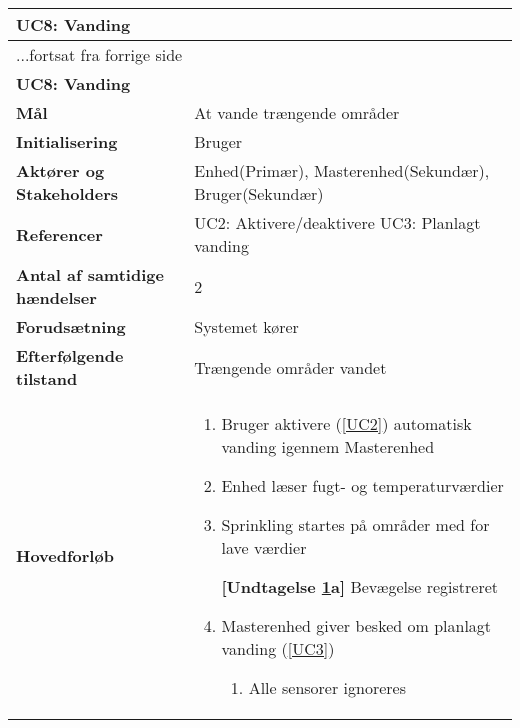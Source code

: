 \begin{center} \centering
	\begin{longtable}{|p{6cm}|p{8cm}|}  %
	\hline
		\multicolumn{2}{|l|}{\textbf{UC8: Vanding}} 		\\\hline %
		\endfirsthead
		
		\multicolumn{2}{l}{...fortsat fra forrige side} 	\\ \hline %
		\multicolumn{2}{|l|}{\textbf{UC8: Vanding}} 		\\\hline %
		\endhead	
		
		\textbf{Mål}								&At vande trængende områder	\\\hline
		\textbf{Initialisering}					&Bruger						\\\hline
		\textbf{Aktører og Stakeholders}			&Enhed(Primær), 
												 Masterenhed(Sekundær), 
												 Bruger(Sekundær)			\\\hline
		\textbf{Referencer}						&UC2: Aktivere/deaktivere 	\newline 
												 UC3: Planlagt vanding		\\\hline
		\textbf{Antal af samtidige hændelser}	&2							\\\hline
		\textbf{Forudsætning}					&Systemet kører				\\\hline
		\textbf{Efterfølgende tilstand}			&Trængende områder vandet	\\\hline
		\textbf{Hovedforløb}					
			&\begin{enumerate}
	
				\item Bruger aktivere (\ref{UC2}) automatisk vanding igennem Masterenhed
				
				\item Enhed læser fugt- og temperaturværdier
				
				\item \label{uc8sprinkler} Sprinkling startes på områder med for lave værdier
				
					\textbf{[Undtagelse \ref{uc8sprinkler}a]} Bevægelse registreret
				
				\item Masterenhed giver besked om planlagt vanding (\ref{UC3})
				
				\begin{enumerate}
					
					\item Alle sensorer ignoreres
					

\end{enumerate}
\end{enumerate}
\end{longtable}
\end{center}
